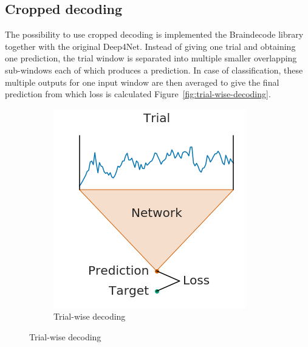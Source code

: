 \subsection{Cropped decoding}\label{subsec:cropped-decoding}
The possibility to use cropped decoding is implemented the Braindecode library together with the original Deep4Net.
Instead of giving one trial and obtaining one prediction, the trial window is separated into multiple smaller overlapping sub-windows each of which produces a prediction.
In case of classification, these multiple outputs for one input window are then averaged to give the final prediction from which loss is calculated Figure~\ref{fig:trial-wise-decoding}.


\begin{figure}[!htpb]
\centering
\begin{subfigure}[b]{0.4\textwidth}
   \includegraphics[width=0.9\linewidth]{img/ch3/trialwise-explanation.png}
   \caption{Trial-wise decoding}
   \label{fig:trial-wise-decoding-trial-wise}
\end{subfigure}


\end{figure}

